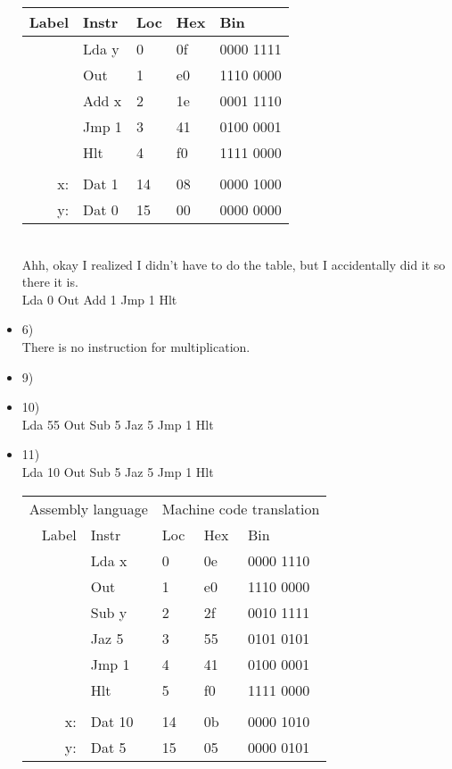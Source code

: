 \documentclass{article}
\begin{document}
\begin{itemize}
\begin{tabular}{rl|lll}
    Label &    Instr & Loc & Hex & Bin \\ \hline
          &    Lda y &   0 &  0f & 0000 1111 \\
          &      Out &   1 &  e0 & 1110 0000 \\
          &    Add x &   2 &  1e & 0001 1110 \\
          &    Jmp 1 &   3 &  41 & 0100 0001 \\
          &      Hlt &   4 &  f0 & 1111 0000 \\
          &          &     &     &           \\
       x: &    Dat 1 &  14 &  08 & 0000 1000 \\
       y: &    Dat 0 &  15 &  00 & 0000 0000 \\
    \end{tabular}\\
    
    Ahh, okay I realized I didn't have to do the table, but I accidentally did it so there it is.\\
    Lda 0 Out Add 1 Jmp 1 Hlt
  \item
    6)\\
    There is no instruction for multiplication.
  \item
    9)\\
  \item
    10)\\
    Lda 55 Out Sub 5 Jaz 5 Jmp 1 Hlt
  \item
    11)\\
    Lda 10 Out Sub 5 Jaz 5 Jmp 1 Hlt\\
    
    \begin{tabular}{rl|lll}
    \multicolumn{2}{c}{Assembly language} & \multicolumn{3}{c}{Machine code translation} \\ 
    Label &    Instr & Loc & Hex & Bin \\ \hline
          &    Lda x &   0 &  0e & 0000 1110 \\
          &      Out &   1 &  e0 & 1110 0000 \\
          &    Sub y &   2 &  2f & 0010 1111 \\
          &    Jaz 5 &   3 &  55 & 0101 0101 \\
          &    Jmp 1 &   4 &  41 & 0100 0001 \\
          &      Hlt &   5 &  f0 & 1111 0000 \\
          &          &     &     &           \\
       x: &   Dat 10 &  14 &  0b & 0000 1010 \\
       y: &    Dat 5 &  15 &  05 & 0000 0101 \\
    \end{tabular}
\end{itemize}
\end{document}
